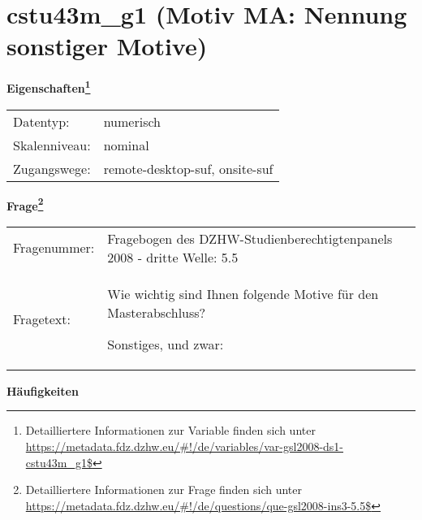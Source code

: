 
    \setcounter{footnote}{0}

    \vspace*{-1.8cm}
	\section{cstu43m\_g1 (Motiv MA: Nennung sonstiger Motive)}
	\label{section:cstu43m_g1}



    \vspace*{0.5cm}
    \noindent\textbf{Eigenschaften\footnote{Detailliertere Informationen zur Variable finden sich unter
		\url{https://metadata.fdz.dzhw.eu/\#!/de/variables/var-gsl2008-ds1-cstu43m_g1$}}}\\
	\begin{tabularx}{\hsize}{@{}lX}
	Datentyp: & numerisch \\
	Skalenniveau: & nominal \\
	Zugangswege: &
	  remote-desktop-suf, 
	  onsite-suf
 \\
    \end{tabularx}



				\vspace*{0.5cm}
                \noindent\textbf{Frage\footnote{Detailliertere Informationen zur Frage finden sich unter
		              \url{https://metadata.fdz.dzhw.eu/\#!/de/questions/que-gsl2008-ins3-5.5$}}}\\
				\begin{tabularx}{\hsize}{@{}lX}
					Fragenummer: &
					  Fragebogen des DZHW-Studienberechtigtenpanels 2008 - dritte Welle:
					  5.5
 \\
					Fragetext: & Wie wichtig sind Ihnen folgende Motive für den Masterabschluss?\par  Sonstiges, und zwar: \\
				\end{tabularx}





        		\vspace*{0.5cm}
                \noindent\textbf{Häufigkeiten}

